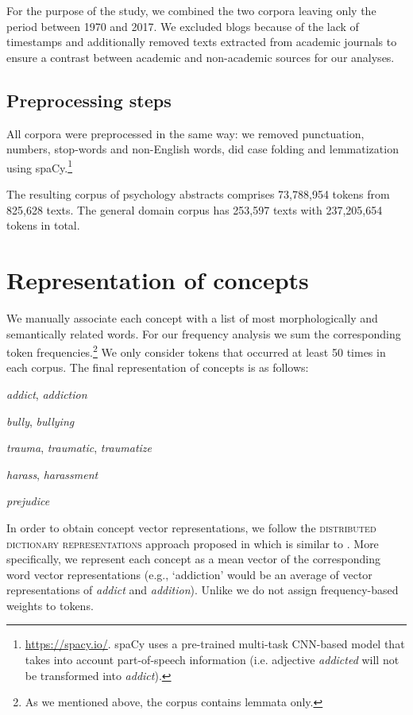 \documentclass[output=paper]{langsci/langscibook}
\begin{document}
For the purpose of the study, we combined the two corpora leaving only the period between 1970 and 2017. We excluded blogs because of the lack of timestamps and additionally removed texts extracted from academic journals to ensure a contrast between academic and non-academic sources for our analyses. 

\subsection{Preprocessing steps}

All corpora were preprocessed in the same way: we removed punctuation, numbers, stop-words and non-English words, did case folding and lemmatization using spaCy.\footnote{\url{https://spacy.io/}. spaCy uses a pre-trained multi-task CNN-based model that takes into account part-of-speech information (i.e. adjective \emph{addicted} will not be transformed into \emph{addict}).}

The resulting corpus of psychology abstracts comprises 73,788,954 tokens from 825,628 texts.
The general domain corpus has 253,597 texts with 237,205,654 tokens in total.

\section{Representation of concepts}\largerpage
We manually associate each concept with a list of most morphologically and semantically related words. For our frequency analysis we sum the corresponding token frequencies.\footnote{As we mentioned above, the corpus contains lemmata only.} We only consider tokens that occurred at least 50 times in each corpus. The final representation of concepts is as follows:

\begin{description}[font=\normalfont]
\item[`Addiction':] \textit{addict}, \textit{addiction}
\item[`Bullying':] \textit{bully}, \textit{bullying}
\item[`Trauma':] \textit{trauma}, \textit{traumatic}, \textit{traumatize}
\item[`Harassment':] \textit{harass}, \textit{harassment}
\item[`Prejudice':] \textit{prejudice}
\end{description}

In order to obtain concept vector representations, we follow the \textsc{distributed dictionary representations} approach proposed in \citet{garten2018dictionaries} which is similar to \citet{mendelsohn2020framework}. More specifically, we represent each concept as a mean vector of the corresponding word vector representations (e.g., `addiction' would be an average of vector representations of \textit{addict} and \textit{addition}).
Unlike \citet{mendelsohn2020framework} we do not assign frequency-based weights to tokens.
\end{document}
